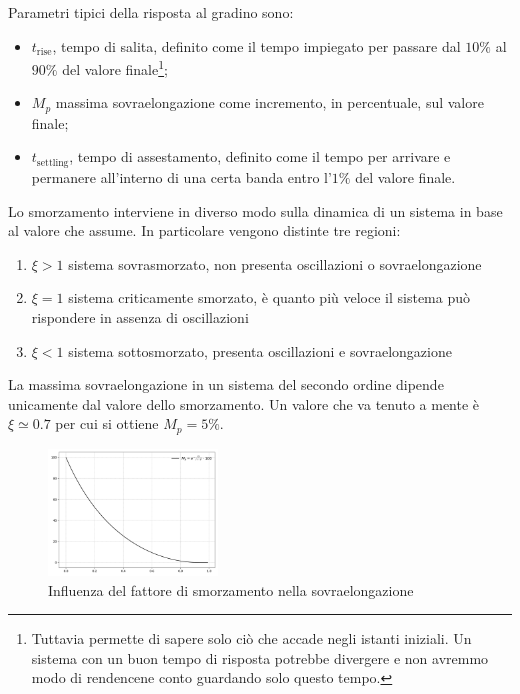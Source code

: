Parametri tipici della risposta al gradino sono: 
\begin{itemize}
    \item \(t_\text{rise}\), tempo di salita, definito come il tempo impiegato per passare dal \(10\%\) al \(90\%\) del valore finale\footnote{Tuttavia permette di sapere solo ciò che accade negli istanti iniziali. Un sistema con un buon tempo di risposta potrebbe divergere e non avremmo modo di rendencene conto guardando solo questo tempo.}; \item \(M_p\) massima sovraelongazione come incremento, in percentuale, sul valore finale; 
    \item \(t_\text{settling}\), tempo di assestamento, definito come il tempo per arrivare e permanere all'interno di una certa banda entro l'\(1\%\) del valore finale.
\end{itemize}

Lo smorzamento interviene in diverso modo sulla dinamica di un sistema in base al valore che assume. In particolare vengono distinte tre regioni:
\begin{enumerate}
    \item \(\xi > 1\) sistema sovrasmorzato, non presenta oscillazioni o sovraelongazione
    \item \(\xi = 1\) sistema criticamente smorzato, è quanto più veloce il sistema può rispondere in assenza di oscillazioni
    \item \(\xi < 1\) sistema sottosmorzato, presenta oscillazioni e sovraelongazione
\end{enumerate}

La massima sovraelongazione in un sistema del secondo ordine dipende unicamente dal valore dello smorzamento. Un valore che va tenuto a mente è \(\xi \simeq 0.7\) per cui si ottiene \(M_p = 5\%\).

\begin{figure}[h]
    \centering
    \includegraphics[width=0.4\textwidth]{Immagini/sovraelongazione_xi.png}
    \caption{Influenza del fattore di smorzamento nella sovraelongazione}
\end{figure}


